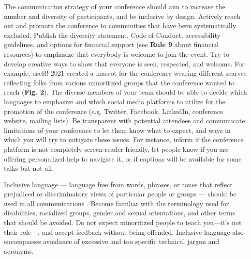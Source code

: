 \documentclass[10pt,letterpaper]{article}
\begin{document}
The communication strategy of your conference should aim to increase the number and diversity of participants, and be inclusive by design.
Actively reach out and promote the conference to communities that have been systematically excluded. 
Publish the diversity statement, Code of Conduct, accessibility guidelines, and options for financial support (see \textbf{Rule 9} about financial resources) to emphasize that everybody is welcome to join the event.
Try to develop creative ways to show that everyone is seen, respected, and welcome. For example, useR! 2021 created a mascot for the conference wearing different scarves reflecting folks from various minoritized groups that the conference wanted to reach (\textbf{Fig. 2}). 
The diverse members of your team should be able to decide which languages to emphasize and which social media platforms to utilize for the promotion of the conference (e.g. Twitter, Facebook, LinkedIn, conference website, mailing lists).
Be transparent with potential attendees and communicate limitations of your conference to let them know what to expect, and ways in which you will try to mitigate these issues. For instance, inform if the conference platform is not completely screen-reader friendly, let people know if you are offering personalized help to navigate it, or if captions will be available for some talks but not all.

 Inclusive language — language free from words, phrases, or tones that reflect prejudiced or discriminatory views of particular people or groups — should be used in all communications \cite{hallDesigningDiversityInclusion2019}. 
Become familiar with the terminology used for disabilities, racialized groups, gender and sexual orientations, and other terms that should be avoided. %
Do not expect minoritized people to teach you—it's not their role—, and accept feedback without being offended.
Inclusive language also encompasses avoidance of excessive and too specific technical jargon and acronyms. 
\end{document}
